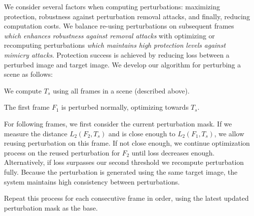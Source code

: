   We consider several
factors when computing perturbations: maximizing protection, robustness
against perturbation removal attacks, and finally, reducing computation
costs. We balance re-using perturbations on subsequent frames \textit{which
  enhances robustness against removal attacks} with optimizing or recomputing
perturbations \textit{which maintains high protection levels against mimicry
  attacks}. Protection success is achieved by reducing loss between a
perturbed image and target image. We develop our algorithm for perturbing a
scene as follows:


\begin{packed_itemize}
  \item We compute $T_s$ using all frames in a scene (described above).
  \item The first frame $F_1$ is perturbed normally, optimizing towards
    $T_s$.
  \item For following frames, we first consider the current perturbation mask.
  If we measure the distance $L_2(F_2,T_s)$ and 
  is close enough to $L_2(F_1,T_s)$, we allow reusing perturbation on this
  frame. If not close enough, we continue optimization process on the reused
  perturbation for $F_2$ until loss decreases enough. Alternatively, if loss
  surpasses our second threshold we recompute perturbation fully. Because the
  perturbation is generated using the same target image, the system maintains
  high consistency between perturbations.
\item Repeat this process for each consecutive frame in order, using the
  latest updated perturbation mask as the base.
\end{packed_itemize}

\fi

